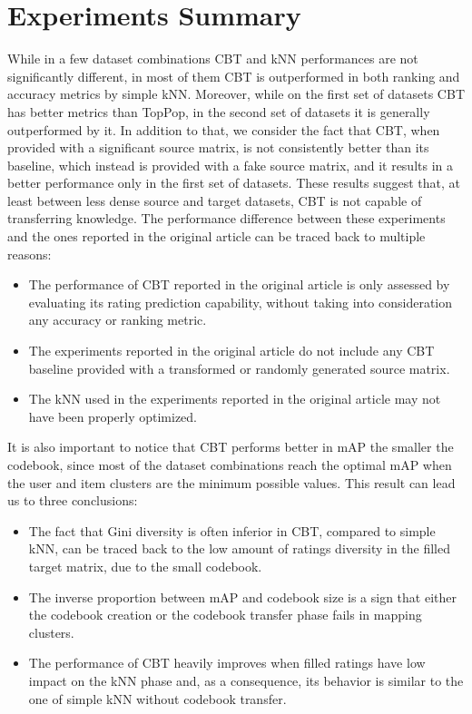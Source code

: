 \clearpage


\section{Experiments Summary}

While in a few dataset combinations CBT and kNN performances are not significantly different, in most of them CBT is outperformed in both ranking and accuracy metrics by simple kNN. Moreover, while on the first set of datasets CBT has better metrics than TopPop, in the second set of datasets it is generally outperformed by it. In addition to that, we consider the fact that CBT, when provided with a significant source matrix, is not consistently better than its baseline, which instead is provided with a fake source matrix, and it results in a better performance only in the first set of datasets. These results suggest that, at least between less dense source and target datasets, CBT is not capable of transferring knowledge. The performance difference between these experiments and the ones reported in the original article can be traced back to multiple reasons:
\begin{itemize}
\item The performance of CBT reported in the original article is only assessed by evaluating its rating prediction capability, without taking into consideration any accuracy or ranking metric.
\item The experiments reported in the original article do not include any CBT baseline provided with a transformed or randomly generated source matrix.
\item The kNN used in the experiments reported in the original article may not have been properly optimized.
\end{itemize}
It is also important to notice that CBT performs better in mAP the smaller the codebook, since most of the dataset combinations reach the optimal mAP when the user and item clusters are the minimum possible values. This result can lead us to three conclusions:
\begin{itemize}
\item The fact that Gini diversity is often inferior in CBT, compared to simple kNN, can be traced back to the low amount of ratings diversity in the filled target matrix, due to the small codebook.
\item The inverse proportion between mAP and codebook size is a sign that either the codebook creation or the codebook transfer phase fails in mapping clusters.
\item The performance of CBT heavily improves when filled ratings have low impact on the kNN phase and, as a consequence, its behavior is similar to the one of simple kNN without codebook transfer.
\end{itemize}